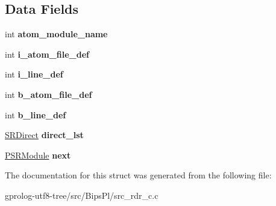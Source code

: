 \subsection*{Data Fields}
\begin{DoxyCompactItemize}
\item 
int {\bfseries atom\+\_\+module\+\_\+name}\hypertarget{structsr__module_a5a1f181c93f13928623ca1426439eac8}{}\label{structsr__module_a5a1f181c93f13928623ca1426439eac8}

\item 
int {\bfseries i\+\_\+atom\+\_\+file\+\_\+def}\hypertarget{structsr__module_a2c69e68be4245afea2ed7d5a69650166}{}\label{structsr__module_a2c69e68be4245afea2ed7d5a69650166}

\item 
int {\bfseries i\+\_\+line\+\_\+def}\hypertarget{structsr__module_a931a2655c0576f16e2776c5c7ac2cf0a}{}\label{structsr__module_a931a2655c0576f16e2776c5c7ac2cf0a}

\item 
int {\bfseries b\+\_\+atom\+\_\+file\+\_\+def}\hypertarget{structsr__module_acc4948aadab6f3f5ae47ee8ea8c083ee}{}\label{structsr__module_acc4948aadab6f3f5ae47ee8ea8c083ee}

\item 
int {\bfseries b\+\_\+line\+\_\+def}\hypertarget{structsr__module_a0c96bc2505a798a709775e61787a1a24}{}\label{structsr__module_a0c96bc2505a798a709775e61787a1a24}

\item 
\hyperlink{structSRDirect}{S\+R\+Direct} {\bfseries direct\+\_\+lst}\hypertarget{structsr__module_a45a2eaca81407f38373afb940bb6dc57}{}\label{structsr__module_a45a2eaca81407f38373afb940bb6dc57}

\item 
\hyperlink{structsr__module}{P\+S\+R\+Module} {\bfseries next}\hypertarget{structsr__module_af8c9ce6870c7f7558096b050d6df683b}{}\label{structsr__module_af8c9ce6870c7f7558096b050d6df683b}

\end{DoxyCompactItemize}


The documentation for this struct was generated from the following file\+:\begin{DoxyCompactItemize}
\item 
gprolog-\/utf8-\/tree/src/\+Bips\+Pl/src\+\_\+rdr\+\_\+c.\+c\end{DoxyCompactItemize}
